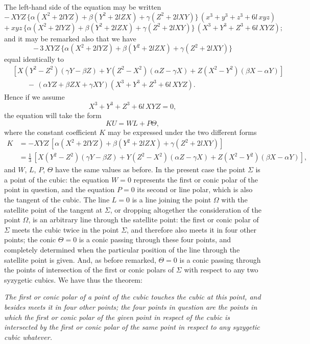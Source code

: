 \documentclass[11pt]{article}
\begin{document}
The left-hand side of the equation may be written
\[
-\,X Y Z\,\{\alpha (X^2 + 2 l Y Z) + \beta (Y^2 + 2 l Z X) + \gamma (Z^2 + 2 l X Y)\}\,(x^3 + y^3 + z^3 + 6 l\, x y z)
\]
\[
+\ x y z\,\{\alpha (X^2 + 2 l Y Z) + \beta (Y^2 + 2 l Z X) + \gamma (Z^2 + 2 l X Y)\}\,(X^3 + Y^3 + Z^3 + 6 l\, X Y Z);
\]
and it may be remarked also that we have
\[
-\,3\, X Y Z\,\{\alpha (X^2 + 2 l Y Z) + \beta (Y^2 + 2 l Z X) + \gamma (Z^2 + 2 l X Y)\}
\]
equal identically to
\begin{align*}
&[X(Y^2 - Z^2)(\gamma Y - \beta Z) + Y(Z^2 - X^2)(\alpha Z - \gamma X) + Z(X^2 - Y^2)(\beta X - \alpha Y)] \\
&\qquad -\,(\alpha Y Z + \beta Z X + \gamma X Y)(X^3 + Y^3 + Z^3 + 6 l\, X Y Z).
\end{align*}
Hence if we assume
\[
X^3 + Y^3 + Z^3 + 6 l\, X Y Z = 0,
\]
the equation will take the form
\[
K U = W L + P \Theta,
\]
where the constant coefficient $K$ may be expressed under the two different forms
\begin{align*}
K &= -X Y Z\,[\alpha (X^2 + 2 l Y Z) + \beta (Y^2 + 2 l Z X) + \gamma (Z^2 + 2 l X Y)] \\
  &= \tfrac{1}{3}\,[X(Y^2 - Z^2)(\gamma Y - \beta Z) + Y(Z^2 - X^2)(\alpha Z - \gamma X) + Z(X^2 - Y^2)(\beta X - \alpha Y)],
\end{align*}
and $W$, $L$, $P$, $\Theta$ have the same values as before. In the present case the point $\Sigma$ is a point of the cubic: the equation $W = 0$ represents the first or conic polar of the point in question, and the equation $P = 0$ its second or line polar, which is also the tangent of the cubic. The line $L = 0$ is a line joining the point $\Omega$ with the satellite point of the tangent at $\Sigma$, or dropping altogether the consideration of the point $\Omega$, is an arbitrary line through the satellite point: the first or conic polar of $\Sigma$ meets the cubic twice in the point $\Sigma$, and therefore also meets it in four other points; the conic $\Theta = 0$ is a conic passing through these four points, and completely determined when the particular position of the line through the satellite point is given. And, as before remarked, $\Theta = 0$ is a conic passing through the points of intersection of the first or conic polars of $\Sigma$ with respect to any two syzygetic cubics. We have thus the theorem:

\medskip

\textit{The first or conic polar of a point of the cubic touches the cubic at this point, and besides meets it in four other points; the four points in question are the points in which the first or conic polar of the given point in respect of the cubic is intersected by the first or conic polar of the same point in respect to any syzygetic cubic whatever.}
\end{document}
